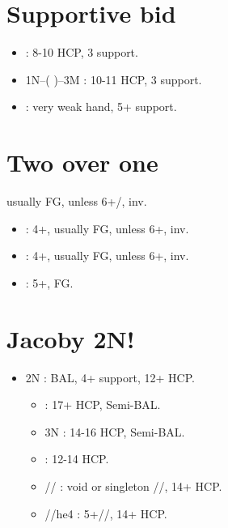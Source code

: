 \documentclass[12pt,twoside,a5paper]{report}%
\begin{document}
	\section*{Supportive bid}
	\begin{itemize}
	\renewcommand{\labelitemi}{}
	\item {} : 8-10 HCP, 3\sp{} support.
	\item 1N--( )--3M : 10-11 HCP, 3\sp{} support.
	\item {} : very weak hand, 5+\sp{} support.
	\end{itemize}

	\section*{Two over one}
	usually FG, unless 6+\cl{}/\di{}, inv.
	\begin{itemize}
	\renewcommand{\labelitemi}{}
	\item {} : 4+\cl{}, usually FG, unless 6+\cl{}, inv.
	\item {} : 4+\di{}, usually FG, unless 6+\di{}, inv.
	\item {} : 5+\he{}, FG.
	\end{itemize}
	
	\section*{Jacoby 2N!}
	\begin{itemize}
	\renewcommand{\labelitemi}{}
	\item 2N : BAL, 4+\sp{} support, 12+ HCP.
		\begin{itemize}
		\renewcommand{\labelitemi}{--}
		\item {} : 17+ HCP, Semi-BAL.
		\item 3N : 14-16 HCP, Semi-BAL.
		\item {} : 12-14 HCP.
		\item {}// : void or singleton //, 14+ HCP.
		\item {}//he{4} : 5+//, 14+ HCP.
		\end{itemize}
	\end{itemize}
\end{document}
